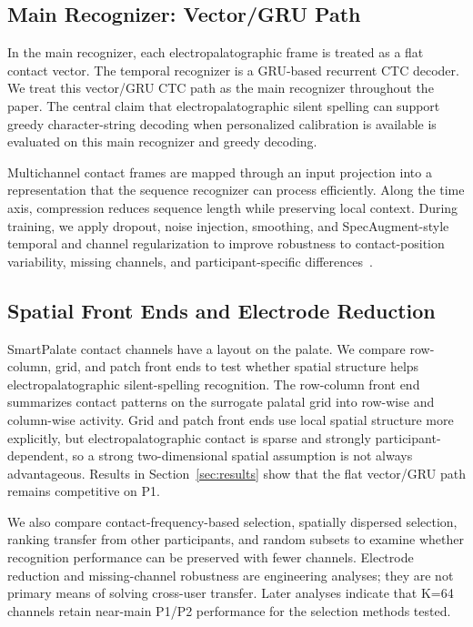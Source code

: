 \subsection{Main Recognizer: Vector/GRU Path}

In the main recognizer, each electropalatographic frame is treated as a flat contact vector.
The temporal recognizer is a GRU-based recurrent CTC decoder.
We treat this vector/GRU CTC path as the main recognizer throughout the paper.
The central claim that electropalatographic silent spelling can support greedy character-string decoding when personalized calibration is available is evaluated on this main recognizer and greedy decoding.

Multichannel contact frames are mapped through an input projection into a representation that the sequence recognizer can process efficiently.
Along the time axis, compression reduces sequence length while preserving local context.
During training, we apply dropout, noise injection, smoothing, and SpecAugment-style temporal and channel regularization to improve robustness to contact-position variability, missing channels, and participant-specific differences~\cite{park2019specaugment}.

\subsection{Spatial Front Ends and Electrode Reduction}

SmartPalate contact channels have a layout on the palate.
We compare row-column, grid, and patch front ends to test whether spatial structure helps electropalatographic silent-spelling recognition.
The row-column front end summarizes contact patterns on the surrogate palatal grid into row-wise and column-wise activity.
Grid and patch front ends use local spatial structure more explicitly, but electropalatographic contact is sparse and strongly participant-dependent, so a strong two-dimensional spatial assumption is not always advantageous.
Results in Section~\ref{sec:results} show that the flat vector/GRU path remains competitive on P1.

We also compare contact-frequency-based selection, spatially dispersed selection, ranking transfer from other participants, and random subsets to examine whether recognition performance can be preserved with fewer channels.
Electrode reduction and missing-channel robustness are engineering analyses; they are not primary means of solving cross-user transfer.
Later analyses indicate that K=64 channels retain near-main P1/P2 performance for the selection methods tested.

